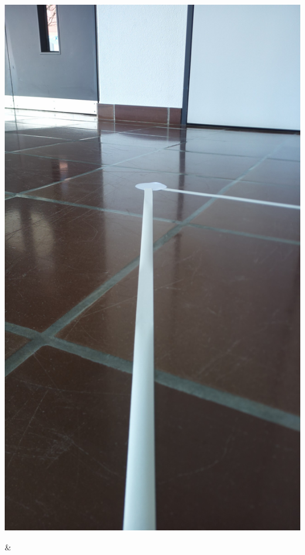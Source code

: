 \begin{table}[H]
\begin{tabularx}
\begin{minipage}{.18\textwidth}
\includegraphics[width=\linewidth]{assets/IT/testing/yolo/node.jpg}
\end{minipage}
        &
\begin{minipage}{.18\textwidth}

\end{minipage}
\end{tabularx}
\end{table}
